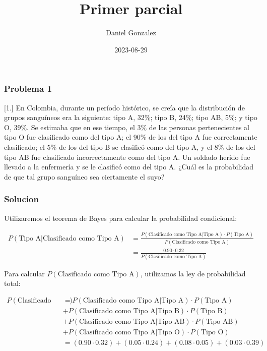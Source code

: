 \documentclass[
]{article}
\title{Primer parcial}
\author{Daniel Gonzalez}
\date{2023-08-29}
\begin{document}
\maketitle

\hypertarget{problema-1}{%
\subsubsection{Problema 1}\label{problema-1}}

{[}1.{]} En Colombia, durante un período histórico, se creía que la
distribución de grupos sanguíneos era la siguiente: tipo A, 32\%; tipo
B, 24\%; tipo AB, 5\%; y tipo O, 39\%. Se estimaba que en ese tiempo, el
3\% de las personas pertenecientes al tipo O fue clasificado como del
tipo A; el 90\% de los del tipo A fue correctamente clasificado; el 5\%
de los del tipo B se clasificó como del tipo A, y el 8\% de los del tipo
AB fue clasificado incorrectamente como del tipo A. Un soldado herido
fue llevado a la enfermería y se le clasificó como del tipo A. ¿Cuál es
la probabilidad de que tal grupo sanguíneo sea ciertamente el suyo?

\hypertarget{solucion}{%
\subsubsection{\texorpdfstring{\textbf{Solucion}}{Solucion}}\label{solucion}}

Utilizaremos el teorema de Bayes para calcular la probabilidad
condicional:

\[\begin{align*}
        P(\text{Tipo A}|\text{Clasificado como Tipo A}) &= \frac{P(\text{Clasificado como Tipo A}|\text{Tipo A}) \cdot P(\text{Tipo A})}{P(\text{Clasificado como Tipo A})} \\
        &= \frac{0.90 \cdot 0.32}{P(\text{Clasificado como Tipo A})}
    \end{align*}
\]

Para calcular \(P(\text{Clasificado como Tipo A})\), utilizamos la ley
de probabilidad total:

\[  
\begin{align*}
        P(\text{Clasificado como Tipo A}) &= P(\text{Clasificado como Tipo A}|\text{Tipo A}) \cdot P(\text{Tipo A}) \\
        &+ P(\text{Clasificado como Tipo A}|\text{Tipo B}) \cdot P(\text{Tipo B}) \\
        &+ P(\text{Clasificado como Tipo A}|\text{Tipo AB}) \cdot P(\text{Tipo AB}) \\
        &+ P(\text{Clasificado como Tipo A}|\text{Tipo O}) \cdot P(\text{Tipo O}) \\
        &= (0.90 \cdot 0.32) + (0.05 \cdot 0.24) + (0.08 \cdot 0.05) + (0.03 \cdot 0.39)
\end{align*}
\]
\end{document}
